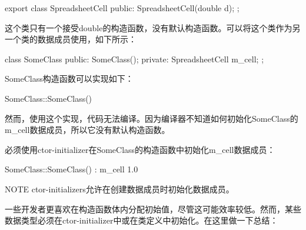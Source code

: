 \begin{cpp}
export class SpreadsheetCell
{
    public:
        SpreadsheetCell(double d);
};
\end{cpp}

这个类只有一个接受double的构造函数，没有默认构造函数。可以将这个类作为另一个类的数据成员使用，如下所示：

\begin{cpp}
class SomeClass
{
    public:
        SomeClass();
    private:
        SpreadsheetCell m_cell;
};
\end{cpp}

SomeClass构造函数可以实现如下：

\begin{cpp}
SomeClass::SomeClass() { }
\end{cpp}

然而，使用这个实现，代码无法编译。因为编译器不知道如何初始化SomeClass的m\_cell数据成员，所以它没有默认构造函数。

必须使用ctor-initializer在SomeClass的构造函数中初始化m\_cell数据成员：

\begin{cpp}
SomeClass::SomeClass() : m_cell { 1.0 } { }
\end{cpp}

\begin{myNotic}{NOTE}
ctor-initializers允许在创建数据成员时初始化数据成员。
\end{myNotic}

一些开发者更喜欢在构造函数体内分配初始值，尽管这可能效率较低。然而，某些数据类型必须在ctor-initializer中或在类定义中初始化。在这里做一下总结：

